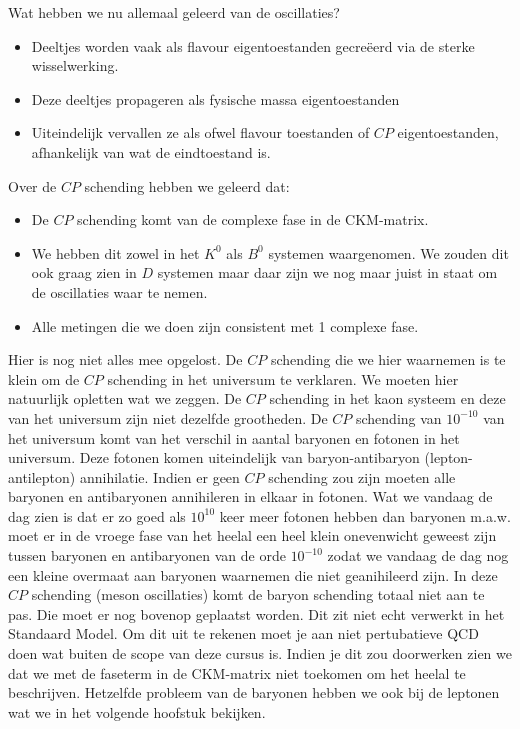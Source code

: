 \documentclass[../main.tex]{subfiles}
\begin{document}
Wat hebben we nu allemaal geleerd van de oscillaties?
\begin{itemize}
    \item Deeltjes worden vaak als flavour eigentoestanden gecreëerd via de sterke wisselwerking.
    \item Deze deeltjes propageren als fysische massa eigentoestanden
    \item Uiteindelijk vervallen ze als ofwel flavour toestanden of $CP$ eigentoestanden, afhankelijk van wat de eindtoestand is.
\end{itemize}
Over de $CP$ schending hebben we geleerd dat:
\begin{itemize}
    \item De $CP$ schending komt van de complexe fase in de CKM-matrix.
    \item We hebben dit zowel in het $K^0$ als $B^0$ systemen waargenomen. We zouden dit ook graag zien in $D$ systemen maar daar zijn we nog maar juist in staat om de oscillaties waar te nemen.
    \item Alle metingen die we doen zijn consistent met 1 complexe fase.
\end{itemize}
Hier is nog niet alles mee opgelost. De $CP$ schending die we hier waarnemen is te klein om de $CP$ schending in het universum te verklaren. We moeten hier natuurlijk opletten wat we zeggen. De $CP$ schending in het kaon systeem en deze van het universum zijn niet dezelfde grootheden. De $CP$ schending van $10^{-10}$ van het universum komt van het verschil in aantal baryonen en fotonen in het universum. Deze fotonen komen uiteindelijk van baryon-antibaryon (lepton-antilepton) annihilatie. Indien er geen $CP$ schending zou zijn moeten alle baryonen en antibaryonen annihileren in elkaar in fotonen. Wat we vandaag de dag zien is dat er zo goed als $10^{10}$ keer meer fotonen hebben dan baryonen m.a.w. moet er in de vroege fase van het heelal een heel klein onevenwicht geweest zijn tussen baryonen en antibaryonen van de orde $10^{-10}$ zodat we vandaag de dag nog een kleine overmaat aan baryonen waarnemen die niet geanihileerd zijn. In deze $CP$ schending (meson oscillaties) komt de baryon schending totaal niet aan te pas. Die moet er nog bovenop geplaatst worden. Dit zit niet echt verwerkt in het Standaard Model. Om dit uit te rekenen moet je aan niet pertubatieve QCD doen wat buiten de scope van deze cursus is. Indien je dit zou doorwerken zien we dat we met de faseterm in de CKM-matrix niet toekomen om het heelal te beschrijven. Hetzelfde probleem van de baryonen hebben we ook bij de leptonen wat we in het volgende hoofstuk bekijken.
\end{document}
